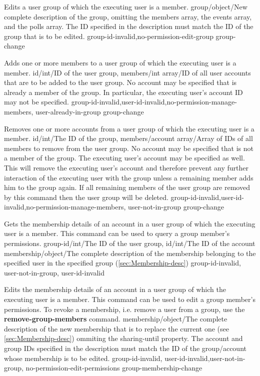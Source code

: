 \documentclass[parskip=full,11pt]{scrartcl}
\begin{document}
{Edits a user group of which the executing user is a member.}
{group/object/New complete description of the group{,} omitting the members
array{,} the events array{,} and the polls array.
The ID specified in the description must match the ID of the group that
is to be edited.}
{}
{group-id-invalid,no-permission-edit-group}
{group-change}

{Adds one or more members to a user group of which the executing user is a
member.}
{id/int/ID of the user group,
members/int array/ID of all user accounts that are to be added to the user
group.
No account may be specified that is already a member of the group.
In particular{,} the executing user's account ID may not be specified.}
{}
{group-id-invalid,user-id-invalid,no-permission-manage-members,%
user-already-in-group}
{group-change}

{Removes one or more accounts from a user group of which the executing user is
a member.}
{id/int/The ID of the group,
members/account array/Array of IDs of all members to remove from the user
group.
No account may be specified that is not a member of the group.
The executing user's account may be specified as well.
This will remove the executing user's account and therefore prevent any further
interaction of the executing user with the group unless a remaining member adds
him to the group again.
If all remaining members of the user group are removed by this command then the
user group will be deleted.}
{}
{group-id-invalid,user-id-invalid,no-permission-manage-members,
user-not-in-group}
{group-change}

{Gets the membership details of an account in a user group of which the
executing user is a member.
This command can be used to query a group member's permissions.}
{group-id/int/The ID of the user group,
id/int/The ID of the account}
{membership/object/The complete description of the membership belonging to
the specified user in the specified group (\ref{sec:Membership-desc})}
{group-id-invalid, user-not-in-group, user-id-invalid}
{}

{Edits the membership details of an account in a user group of which the
executing user is a member.
This command can be used to edit a group member's permissions.
To revoke a membership, i.e. remove a user from a group, use the
\textbf{remove-group-members} command.}
{membership/object/The complete description of the new membership that is to
replace the current one (see \ref{sec:Membership-desc}) ommiting the
sharing-until property.
The account and group IDs specified in the description must match the ID of
the group{/}account whose membership is to be edited.}
{}
{group-id-invalid, user-id-invalid,user-not-in-group, no-permission-edit-permissions}
{group-membership-change}
\end{document}
